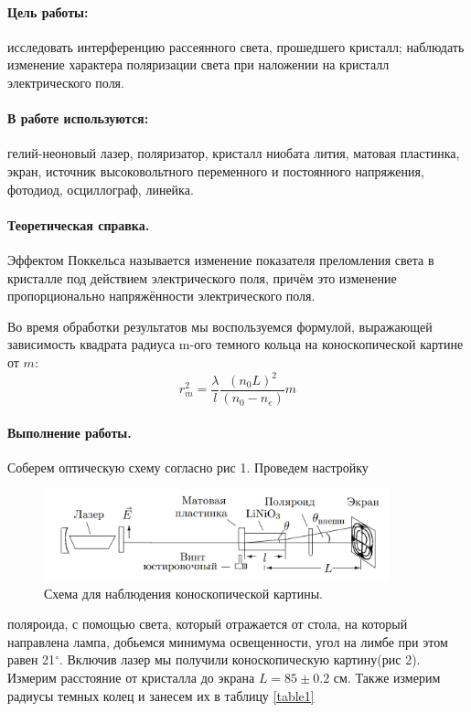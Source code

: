 \documentclass{letask}
\begin{document}


\paragraph{Цель работы:} исследовать интерференцию рассеянного света, прошедшего кристалл; наблюдать изменение характера поляризации света при наложении на кристалл электрического поля.
\paragraph{В работе используются:} гелий-неоновый лазер, поляризатор, кристалл ниобата лития, матовая пластинка, экран, источник высоковольтного переменного и постоянного напряжения, фотодиод, осциллограф, линейка.
\paragraph{Теоретическая справка.} Эффектом Поккельса называется изменение показателя преломления света в кристалле под действием электрического поля, причём это изменение пропорционально напряжённости электрического поля.

Во время обработки результатов мы воспользуемся формулой, выражающей зависимость квадрата радиуса m-ого темного кольца на коноскопической картине от $ m $:
\begin{equation}
	r_m^2 = \dfrac{\lambda}{l}\dfrac{\left( n_0L\right)^2}{(n_0-n_e)}m
\end{equation}


\paragraph{Выполнение работы.}
Соберем оптическую схему согласно рис 1. Проведем настройку
\begin{figure}
	\label{scheme1}
	\includegraphics[width=100mm]{scheme1}
	\caption{Схема для наблюдения коноскопической картины.}
\end{figure}
 поляроида, с помощью света, который отражается от стола, на который направлена лампа, добьемся минимума освещенности, угол на лимбе при этом равен 21$ ^\circ $. Включив лазер мы получили коноскопическую картину(рис 2). Измерим расстояние от кристалла до экрана $ L = 85 \pm 0.2$ см. Также измерим радиусы темных колец и занесем их в таблицу \ref{table1}
\end{document}
